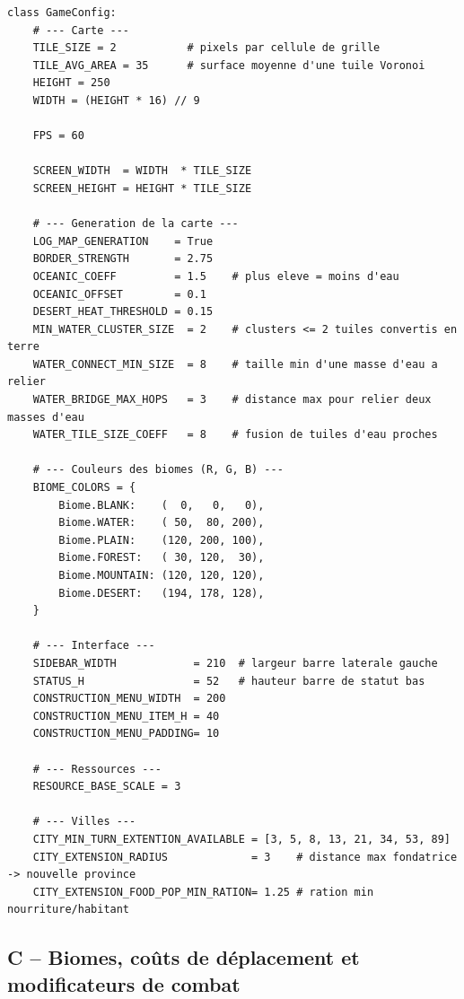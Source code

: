 \documentclass[12pt, a4paper]{article}
\begin{document}
\begin{lstlisting}[style=python, caption={Fichier \texttt{config.py} – constantes globales}, label={lst:config_full}]
class GameConfig:
    # --- Carte ---
    TILE_SIZE = 2           # pixels par cellule de grille
    TILE_AVG_AREA = 35      # surface moyenne d'une tuile Voronoi
    HEIGHT = 250
    WIDTH = (HEIGHT * 16) // 9

    FPS = 60

    SCREEN_WIDTH  = WIDTH  * TILE_SIZE
    SCREEN_HEIGHT = HEIGHT * TILE_SIZE

    # --- Generation de la carte ---
    LOG_MAP_GENERATION    = True
    BORDER_STRENGTH       = 2.75
    OCEANIC_COEFF         = 1.5    # plus eleve = moins d'eau
    OCEANIC_OFFSET        = 0.1
    DESERT_HEAT_THRESHOLD = 0.15
    MIN_WATER_CLUSTER_SIZE  = 2    # clusters <= 2 tuiles convertis en terre
    WATER_CONNECT_MIN_SIZE  = 8    # taille min d'une masse d'eau a relier
    WATER_BRIDGE_MAX_HOPS   = 3    # distance max pour relier deux masses d'eau
    WATER_TILE_SIZE_COEFF   = 8    # fusion de tuiles d'eau proches

    # --- Couleurs des biomes (R, G, B) ---
    BIOME_COLORS = {
        Biome.BLANK:    (  0,   0,   0),
        Biome.WATER:    ( 50,  80, 200),
        Biome.PLAIN:    (120, 200, 100),
        Biome.FOREST:   ( 30, 120,  30),
        Biome.MOUNTAIN: (120, 120, 120),
        Biome.DESERT:   (194, 178, 128),
    }

    # --- Interface ---
    SIDEBAR_WIDTH            = 210  # largeur barre laterale gauche
    STATUS_H                 = 52   # hauteur barre de statut bas
    CONSTRUCTION_MENU_WIDTH  = 200
    CONSTRUCTION_MENU_ITEM_H = 40
    CONSTRUCTION_MENU_PADDING= 10

    # --- Ressources ---
    RESOURCE_BASE_SCALE = 3

    # --- Villes ---
    CITY_MIN_TURN_EXTENTION_AVAILABLE = [3, 5, 8, 13, 21, 34, 53, 89]
    CITY_EXTENSION_RADIUS             = 3    # distance max fondatrice -> nouvelle province
    CITY_EXTENSION_FOOD_POP_MIN_RATION= 1.25 # ration min nourriture/habitant
\end{lstlisting}

\subsection*{C – Biomes, coûts de déplacement et modificateurs de combat}
\end{document}
